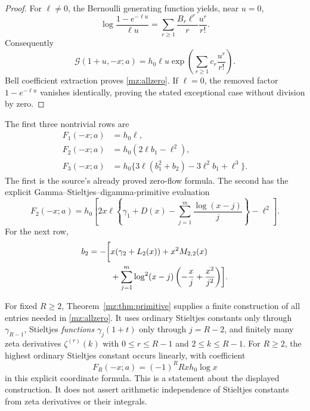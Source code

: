 \begin{proof}
For $\ell\ne0$, the Bernoulli generating function yields, near $u=0$,
\begin{equation}
 \log\frac{1-e^{-\ell u}}{\ell u}
       =\sum_{r\ge1}\frac{B_r\ell^r}{r}\frac{u^r}{r!}.
 \label{mz:Bernoulli}
\end{equation}
Consequently
\[
 \mathcal G(1+u,-x;a)
       =h_0\ell u\exp\left(\sum_{r\ge1}c_r\frac{u^r}{r!}\right).
\]
Bell coefficient extraction proves \eqref{mz:allzero}. If $\ell=0$,
the removed factor $1-e^{-\ell u}$ vanishes identically, proving the
stated exceptional case without division by zero.
\end{proof}

The first three nontrivial rows are
\begin{align}
 F_1(-x;a)&=h_0\ell,\label{mz:F1}\\
 F_2(-x;a)&=h_0(2\ell b_1-\ell^2),\label{mz:F2b}\\
 F_3(-x;a)&=h_0\{3\ell(b_1^2+b_2)-3\ell^2b_1+\ell^3\}.
 \label{mz:F3}
\end{align}
The first is the source's already proved zero-flow formula. The second has
the explicit Gamma--Stieltjes--digamma-primitive evaluation
\begin{equation}
 \boxed{F_2(-x;a)=h_0\left[
   2x\ell\left\{\gamma_1+D(x)
           -\sum_{j=1}^{m}\frac{\log(x-j)}j\right\}-\ell^2\right].}
 \label{mz:F2}
\end{equation}
For the next row,
\begin{align}
 b_2=-\biggl[&x(\gamma_2+L_2(x))+x^2M_{2,2}(x)\notag\\
 &+\sum_{j=1}^{m}\log^2(x-j)
                    \left(-\frac xj+\frac{x^2}{j^2}\right)\biggr].
 \label{mz:b2}
\end{align}

For fixed $R\ge2$, Theorem~\ref{mz:thm:primitive} supplies a finite construction
of all entries needed in \eqref{mz:allzero}. It uses ordinary Stieltjes
constants only through $\gamma_{R-1}$, Stieltjes \emph{functions}
$\gamma_j(1+t)$ only through $j=R-2$, and finitely many zeta derivatives
$\zeta^{(r)}(k)$ with $0\le r\le R-1$ and $2\le k\le R-1$.
For $R\ge2$, the highest ordinary Stieltjes constant occurs linearly,
with coefficient
\begin{equation}
 [\gamma_{R-1}]F_R(-x;a)
       =(-1)^R R x h_0\log x
 \label{mz:highest}
\end{equation}
in this explicit coordinate formula. This is a statement about the
displayed construction. It does not assert arithmetic independence of
Stieltjes constants from zeta derivatives or their integrals.


